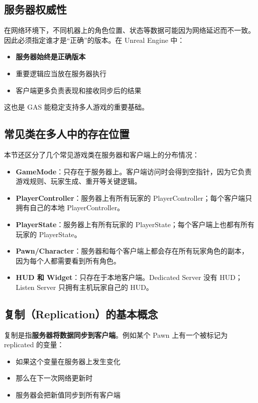 \subsection{服务器权威性}

在网络环境下，不同机器上的角色位置、状态等数据可能因为网络延迟而不一致。因此必须指定谁才是“正确”的版本。在 Unreal Engine 中：

\begin{itemize}
	\item \textbf{服务器始终是正确版本}
	\item 重要逻辑应当放在服务器执行
	\item 客户端更多负责表现和接收同步后的结果
\end{itemize}

这也是 GAS 能稳定支持多人游戏的重要基础。

\subsection{常见类在多人中的存在位置}

本节还区分了几个常见游戏类在服务器和客户端上的分布情况：

\begin{itemize}
	\item \textbf{GameMode}：只存在于服务器上。客户端访问时会得到空指针，因为它负责游戏规则、玩家生成、重开等关键逻辑。
	\item \textbf{PlayerController}：服务器上有所有玩家的 PlayerController；每个客户端只拥有自己的本地 PlayerController。
	\item \textbf{PlayerState}：服务器上有所有玩家的 PlayerState；每个客户端上也都有所有玩家的 PlayerState。
	\item \textbf{Pawn/Character}：服务器和每个客户端上都会存在所有玩家角色的副本，因为每个人都需要看到所有角色。
	\item \textbf{HUD 和 Widget}：只存在于本地客户端。Dedicated Server 没有 HUD；Listen Server 只拥有主机玩家自己的 HUD。
\end{itemize}

\subsection{复制（Replication）的基本概念}

复制是指\textbf{服务器将数据同步到客户端}。例如某个 Pawn 上有一个被标记为 replicated 的变量：

\begin{itemize}
	\item 如果这个变量在服务器上发生变化
	\item 那么在下一次网络更新时
	\item 服务器会把新值同步到所有客户端
\end{itemize}

